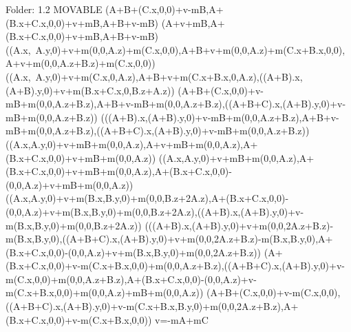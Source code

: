 Folder: 1.2 MOVABLE
\left(A+B+\left(C.x,0,0\right)+v-mB,A+\left(B.x+C.x,0,0\right)+v+mB,A+B+v-mB\right)
\left(A+v+mB,A+\left(B.x+C.x,0,0\right)+v+mB,A+B+v-mB\right)
\left(\left(A.x,\ A.y,0\right)+v+m\left(0,0,A.z\right)+m\left(C.x,0,0\right),A+B+v+m\left(0,0,A.z\right)+m\left(C.x+B.x,0,0\right),\ A+v+m\left(0,0,A.z+B.z\right)+m\left(C.x,0,0\right)\right)
\left(\left(A.x,\ A.y,0\right)+v+m\left(C.x,0,A.z\right),A+B+v+m\left(C.x+B.x,0,A.z\right),\left(\left(A+B\right).x,\left(A+B\right).y,0\right)+v+m\left(B.x+C.x,0,B.z+A.z\right)\right)
\left(A+B+\left(C.x,0,0\right)+v-mB+m\left(0,0,A.z+B.z\right),A+B+v-mB+m\left(0,0,A.z+B.z\right),\left(\left(A+B+C\right).x,\left(A+B\right).y,0\right)+v-mB+m\left(0,0,A.z+B.z\right)\right)
\left(\left(\left(A+B\right).x,\left(A+B\right).y,0\right)+v-mB+m\left(0,0,A.z+B.z\right),A+B+v-mB+m\left(0,0,A.z+B.z\right),\left(\left(A+B+C\right).x,\left(A+B\right).y,0\right)+v-mB+m\left(0,0,A.z+B.z\right)\right)
\left(\left(A.x,A.y,0\right)+v+mB+m\left(0,0,A.z\right),A+v+mB+m\left(0,0,A.z\right),A+\left(B.x+C.x,0,0\right)+v+mB+m\left(0,0,A.z\right)\right)
\left(\left(A.x,A.y,0\right)+v+mB+m\left(0,0,A.z\right),A+\left(B.x+C.x,0,0\right)+v+mB+m\left(0,0,A.z\right),A+\left(B.x+C.x,0,0\right)-\left(0,0,A.z\right)+v+mB+m\left(0,0,A.z\right)\right)
\left(\left(A.x,A.y,0\right)+v+m\left(B.x,B.y,0\right)+m\left(0,0,B.z+2A.z\right),A+\left(B.x+C.x,0,0\right)-\left(0,0,A.z\right)+v+m\left(B.x,B.y,0\right)+m\left(0,0,B.z+2A.z\right),\left(\left(A+B\right).x,\left(A+B\right).y,0\right)+v-m\left(B.x,B.y,0\right)+m\left(0,0,B.z+2A.z\right)\right)
\left(\left(\left(A+B\right).x,\left(A+B\right).y,0\right)+v+m\left(0,0,2A.z+B.z\right)-m\left(B.x,B.y,0\right),\left(\left(A+B+C\right).x,\left(A+B\right).y,0\right)+v+m\left(0,0,2A.z+B.z\right)-m\left(B.x,B.y,0\right),A+\left(B.x+C.x,0,0\right)-\left(0,0,A.z\right)+v+m\left(B.x,B.y,0\right)+m\left(0,0,2A.z+B.z\right)\right)
\left(A+\left(B.x+C.x,0,0\right)+v-m\left(C.x+B.x,0,0\right)+m\left(0,0,A.z+B.z\right),\left(\left(A+B+C\right).x,\left(A+B\right).y,0\right)+v-m\left(C.x,0,0\right)+m\left(0,0,A.z+B.z\right),A+\left(B.x+C.x,0,0\right)-\left(0,0,A.z\right)+v-m\left(C.x+B.x,0,0\right)+m\left(0,0,A.z\right)+mB+m\left(0,0,A.z\right)\right)
\left(A+B+\left(C.x,0,0\right)+v-m\left(C.x,0,0\right),\left(\left(A+B+C\right).x,\left(A+B\right).y,0\right)+v-m\left(C.x+B.x,B.y,0\right)+m\left(0,0,2A.z+B.z\right),A+\left(B.x+C.x,0,0\right)+v-m\left(C.x+B.x,0,0\right)\right)
v=-mA+mC

